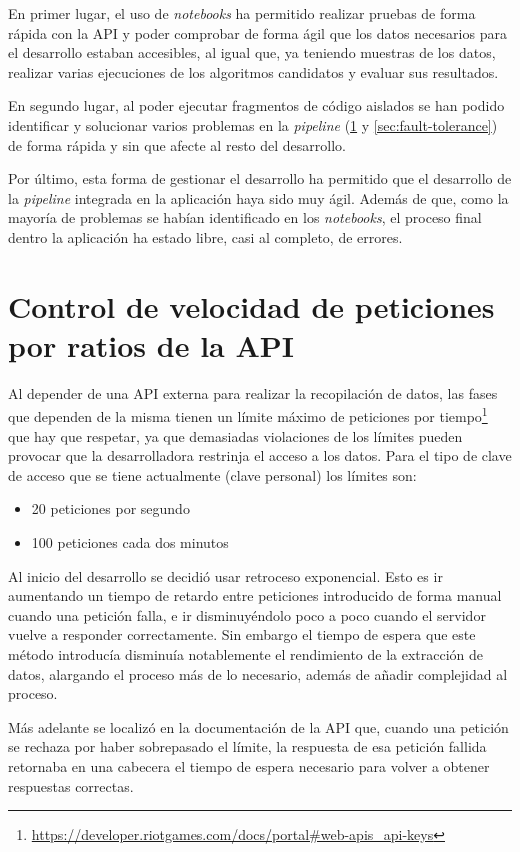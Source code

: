 En primer lugar, el uso de \textit{notebooks} ha permitido realizar pruebas de forma rápida con la API y poder comprobar de forma ágil que los datos necesarios para el desarrollo estaban accesibles, al igual que, ya teniendo muestras de los datos, realizar varias ejecuciones de los algoritmos candidatos y evaluar sus resultados.

En segundo lugar, al poder ejecutar fragmentos de código aislados se han podido identificar y solucionar varios problemas en la \textit{pipeline} (\ref{sec:rate-limit} y \ref{sec:fault-tolerance}) de forma rápida y sin que afecte al resto del desarrollo.

Por último, esta forma de gestionar el desarrollo ha permitido que el desarrollo de la \textit{pipeline} integrada en la aplicación haya sido muy ágil. Además de que, como la mayoría de problemas se habían identificado en los \textit{notebooks}, el proceso final dentro la aplicación ha estado libre, casi al completo, de errores.

\section{Control de velocidad de peticiones por ratios de la API}\label{sec:rate-limit}
Al depender de una API externa para realizar la recopilación de datos, las fases que dependen de la misma tienen un límite máximo de peticiones por tiempo\footnote{\url{https://developer.riotgames.com/docs/portal\#web-apis_api-keys}} que hay que respetar, ya que demasiadas violaciones de los límites pueden provocar que la desarrolladora restrinja el acceso a los datos. Para el tipo de clave de acceso que se tiene actualmente (clave personal) los límites son:
\begin{itemize}
	\tightlist
	\item 20 peticiones por segundo
	\item 100 peticiones cada dos minutos
\end{itemize}
Al inicio del desarrollo se decidió usar retroceso exponencial. Esto es ir aumentando un tiempo de retardo entre peticiones introducido de forma manual cuando una petición falla, e ir disminuyéndolo poco a poco cuando el servidor vuelve a responder correctamente. Sin embargo el tiempo de espera que este método introducía disminuía notablemente el rendimiento de la extracción de datos, alargando el proceso más de lo necesario, además de añadir complejidad al proceso.

Más adelante se localizó en la documentación de la API que, cuando una petición se rechaza por haber sobrepasado el límite, la respuesta de esa petición fallida retornaba en una cabecera el tiempo de espera necesario para volver a obtener respuestas correctas.

